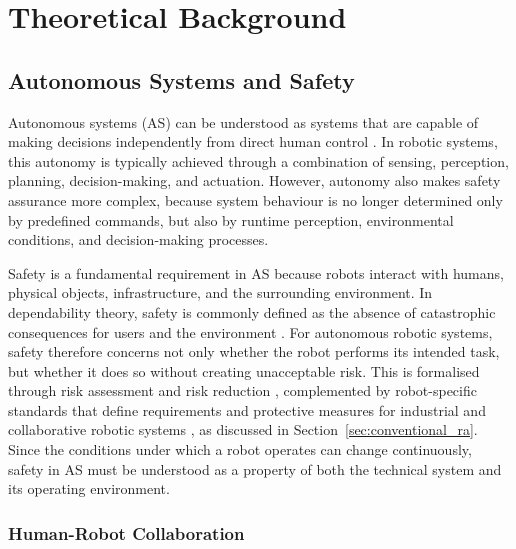 \chapter{Theoretical Background}

\captionsetup{font=small, labelfont=small}


\section{Autonomous Systems and Safety}

{\small

Autonomous systems (AS) can be understood as systems that are capable of making decisions independently from direct human control \cite{osborne2022decisionmaking}. In robotic systems, this autonomy is typically achieved through a combination of sensing, perception, planning, decision-making, and actuation. However, autonomy also makes safety assurance more complex, because system behaviour is no longer determined only by predefined commands, but also by runtime perception, environmental conditions, and decision-making processes.

Safety is a fundamental requirement in AS because robots interact with humans, physical objects, infrastructure, and the surrounding environment. In dependability theory, safety is commonly defined as the absence of catastrophic consequences for users and the environment \cite{avizienis2004dependability}. For autonomous robotic systems, safety therefore concerns not only whether the robot performs its intended task, but whether it does so without creating unacceptable risk. This is formalised through risk assessment and risk reduction \cite{iso12100}, complemented by robot-specific standards that define requirements and protective measures for industrial and collaborative robotic systems \cite{iso10218_1_2025,iso10218_2_2025,iso15066}, as discussed in Section~\ref{sec:conventional_ra}. Since the conditions under which a robot operates can change continuously, safety in AS must be understood as a property of both the technical system and its operating environment.

}

\subsection{Human-Robot Collaboration}


